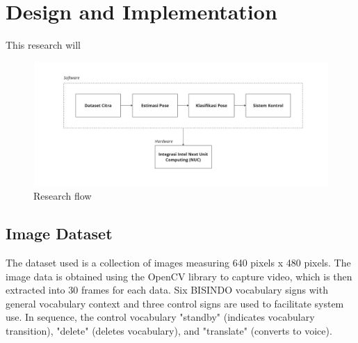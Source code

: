 
\section{Design and Implementation}
\label{sec:designandimplementation}

This research will 

\begin{figure}[ht]
  \centering
  \includegraphics[scale=0.095]{gambar/bab3-block-diagram-nuc.jpg}
  \caption{Research flow}
  \label{fig:blockdiagrammethod}
\end{figure}

\subsection{Image Dataset}
\label{subsec:imagedataset}

The dataset used is a collection of images measuring 640 pixels x 480 pixels. The image data is obtained using the OpenCV library to capture video, which is then extracted into 30 frames for each data. Six BISINDO vocabulary signs with general vocabulary context and three control signs are used to facilitate system use. In sequence, the control vocabulary "standby" (indicates vocabulary transition), "delete" (deletes vocabulary), and "translate" (converts to voice).

